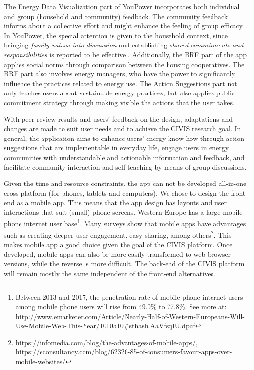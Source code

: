 The Energy Data Visualization part of YouPower incorporates both individual and group (household and community) feedback. The community feedback informs about a collective effort and might enhance the feeling of group efficacy \cite{bandura1997self}. In YouPower, the special attention is given to the household context, since bringing \textit{family values into discussion} and establishing \textit{shared commitments and responsibilities} is reported to be effective \cite{huizenga2015shedding}. Additionally, the BRF part of the app applies social norms through comparison between the housing cooperatives. The BRF part also involves energy managers, who have the power to significantly influence the practices related to energy use. The Action Suggestions part not only teaches users about sustainable energy practices, but also applies public commitment strategy through making visible the actions that the user takes.

With peer review results and users' feedback on the design, adaptations and changes are made to suit user needs and to achieve the CIVIS research goal. 
In general, the application aims to enhance users' energy know-how through action suggestions that are implementable in everyday life, engage users in energy communities with understandable and actionable information and feedback, and facilitate community interaction and self-teaching by means of group discussions.

Given the time and resource constraints, the app can not be developed all-in-one cross-platform (for phones, tablets and computers). We chose to design the front-end as a mobile app. This means that the app design has layouts and user interactions that suit (small) phone screens. %
Western Europe has a large mobile phone internet user base\footnote{
Between 2013 and 2017, the penetration rate of mobile phone internet users among mobile phone users will rise from 49.0\% to 77.8\%. See more at: \url{ http://www.emarketer.com/Article/Nearly-Half-of-Western-Europeans-Will-Use-Mobile-Web-This-Year/1010510\#sthash.AaVfsqIU.dpuf}}. Many surveys show that mobile apps have advantages such as creating deeper user engagement, easy sharing, among others\footnote{\url{https://infomedia.com/blog/the-advantages-of-mobile-apps/}, \url{https://econsultancy.com/blog/62326-85-of-consumers-favour-apps-over-mobile-websites/}}. This makes mobile app a good choice given the goal of the CIVIS platform. Once developed, mobile apps can also be more easily transformed to web browser versions, while the reverse is more difficult. The back-end of the CIVIS platform will remain mostly the same independent of the front-end alternatives. 